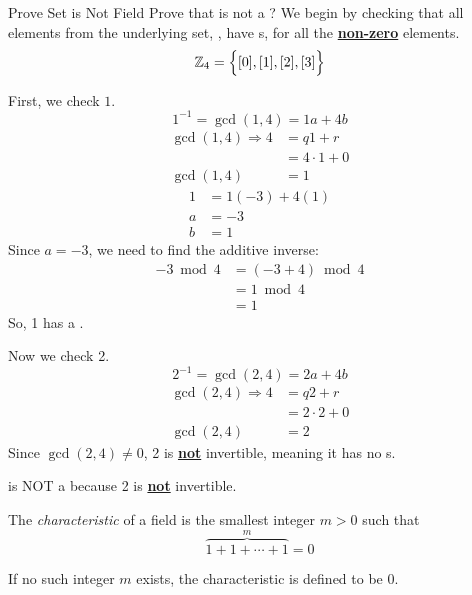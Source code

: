 \begin{example}{Prove Set is Not Field}
  Prove that  is not a ?
  \tcblower{}
  We begin by checking that all elements from the underlying set, , have s, for all the \textbf{\underline{non-zero}} elements.
  \begin{equation*}
    \operatorname{\mathbb{Z}}_{4} = \Bigl \lbrace [0], [1], [2], [3] \Bigr \rbrace
  \end{equation*}

  First, we check $1$.
  \begin{equation*}
    1^{-1} = \gcd(1, 4) = 1a + 4b
  \end{equation*}
  \begin{align*}
    \gcd(1, 4) \Rightarrow 4 &= q1 + r \\
                             &= 4 \cdot 1 + 0 \\
    \gcd(1, 4) &= 1
  \end{align*}
  \begin{align*}
    1 &= 1 (-3) + 4 (1) \\
    a &= -3 \\
    b &= 1
  \end{align*}
  Since $a = -3$, we need to find the additive inverse:
  \begin{align*}
    -3 \bmod 4 &= (-3 + 4) \bmod 4 \\
               &= 1 \bmod 4 \\
               &= 1
  \end{align*}
  So, 1 has a .

  Now we check 2.
  \begin{equation*}
    2^{-1} = \gcd(2, 4) = 2a + 4b
  \end{equation*}
  \begin{align*}
    \gcd(2, 4) \Rightarrow 4 &= q2 + r \\
                             &= 2 \cdot 2 + 0 \\
    \gcd(2, 4) &= 2
  \end{align*}
  Since $\gcd(2, 4) \neq 0$, 2 is \textbf{\underline{not}} invertible, meaning it has no s.

   is NOT a  because 2 is \textbf{\underline{not}} invertible.
\end{example}

\begin{definition}[Characteristic]\label{def:Field_Characteristic}
  The \emph{characteristic} of a field is the smallest integer $m > 0$ such that
  \begin{equation}\label{eq:Field_Characteristic}
    \overbrace{1 + 1 + \cdots + 1}^{m} = 0
  \end{equation}

  If no such integer $m$ exists, the characteristic is defined to be 0.
\end{definition}


